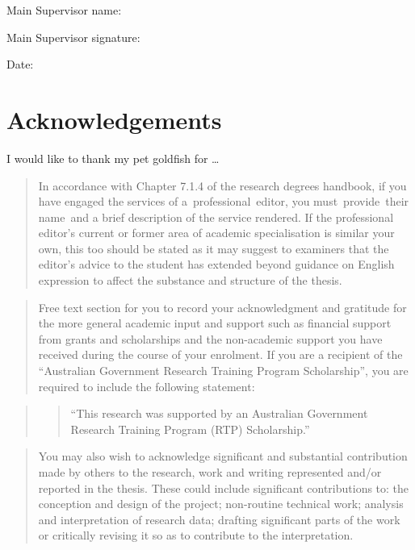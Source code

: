 \documentclass{uniexeterthesis}
\begin{document}
Main Supervisor name:

Main Supervisor signature:

Date:


\hypertarget{acknowledgements}{%
\chapter*{Acknowledgements}\label{acknowledgements}}


I would like to thank my pet goldfish for \ldots{}

\begin{quote}
In accordance with Chapter 7.1.4 of the research degrees handbook, if
you have engaged the services of a~professional~editor, you
must~provide~their name~and a brief description of the service rendered.
If the professional editor's current or former area of academic
specialisation is similar your own, this too should be stated as it may
suggest to examiners that the editor's advice to the student has
extended beyond guidance on English expression to affect the substance
and structure of the thesis.
\end{quote}

\begin{quote}
Free text section for you to record your acknowledgment and gratitude
for the more general academic input and support such as financial
support from grants and scholarships and the non-academic support you
have received during the course of your enrolment. If you are a
recipient of the ``Australian Government Research Training Program
Scholarship'', you are required to include the following statement:
\end{quote}

\begin{quote}
\begin{quote}
``This research was supported by an Australian Government Research
Training Program (RTP) Scholarship.''
\end{quote}
\end{quote}

\begin{quote}
You may also wish to acknowledge significant and substantial
contribution made by others to the research, work and writing
represented and/or reported in the thesis. These could include
significant contributions to: the conception and design of the project;
non-routine technical work; analysis and interpretation of research
data; drafting significant parts of the work or critically revising it
so as to contribute to the interpretation.
\end{quote}
\end{document}
